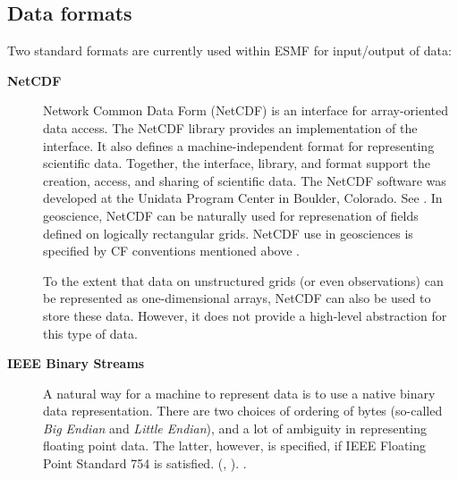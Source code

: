 \subsection{Data formats}

Two standard formats are currently used within ESMF for input/output of data:

\begin{description}
\item[\bf NetCDF] Network Common Data Form (NetCDF) is an interface for 
array-oriented data access. The NetCDF library provides an
implementation of the interface. It also defines a 
machine-independent format for representing scientific data. Together,
the interface, library, and format support the creation, access, and
sharing of scientific data. The NetCDF software was developed at the
Unidata Program Center in Boulder, Colorado. See \cite{NetCDF3_UsersGuide_C}.
In geoscience, NetCDF can be naturally used for represenation of fields 
defined on logically rectangular grids. NetCDF use in geosciences is 
specified by CF conventions mentioned above \cite{NetCDF_CF_v1_beta3}. 

To the extent that data on unstructured grids (or even observations) can be 
represented as one-dimensional arrays, NetCDF can also be used to store these 
data. However, it does not provide a high-level abstraction for this type of 
data. 

\item[\bf IEEE Binary Streams]
A natural way for a machine to represent data is to use a native
binary data representation. There are two choices of ordering of bytes
(so-called {\it Big Endian} and {\it Little Endian}), and a lot of
ambiguity in representing floating point data. The latter, however, is
specified, if IEEE Floating Point Standard 754 is satisfied.
(\cite{IEEE-Floating-Point}, \cite{Kahan-IEEE-754}). 
\cite{XML-W3C}.

\end{description}

